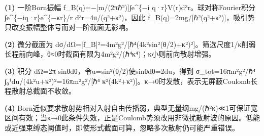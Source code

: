 \par\noindent\textbf{(1)} 一阶Born振幅 f\_B(q)=−[m/(2πℏ²)]∫e\textasciicircum{}\{−i q·r\}V(r)d³r。球对称Fourier积分 ∫e\textasciicircum{}\{−iq·r\}e\textasciicircum{}\{−κr\}/r d³r=4π/(q²+κ²)，因此 f\_B(q)=2mg/[ℏ²(q²+κ²)]，吸引势只改变振幅整体号而对一阶截面无影响。
\par\noindent\textbf{(2)} 微分截面为 dσ/dΩ=|f\_B|²=4m²g²/[ℏ⁴(4k²sin²(θ/2)+κ²)²]。筛选尺度1/κ削弱长程前向峰，θ≈0时截面有限为4m²g²/(ℏ⁴κ⁴)；κ小则前向散射增强。
\par\noindent\textbf{(3)} 积分 dΩ=2π sinθdθ，令u=sin²(θ/2)使sinθdθ=2du，得到 σ\_tot=16πm²g²/ℏ⁴ ∫₀¹du/(4k²u+κ²)²=16πm²g²/[ℏ⁴ κ²(4k²+κ²)]。κ→0时发散，表示无屏蔽Coulomb长程散射总截面不收敛。
\par\noindent\textbf{(4)} Born近似要求散射势相对入射自由传播弱，典型无量纲mg/(ℏ²κ)≪1可保证宽区间有效；当κ→0此条件失效，正是Coulomb势须改用非微扰散射波的原因。低能或近强束缚态阈值时，即使形式截面可算，忽略多次散射仍可能严重错误。
